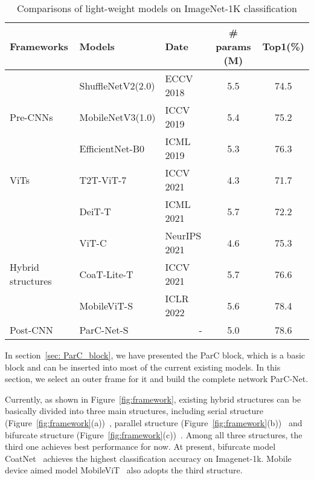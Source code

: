 \documentclass[10pt,twocolumn,letterpaper]{article}
\begin{document}
\begin{table*}[t]
\renewcommand\arraystretch{1.0}
\begin{center}
\begin{tabular}{l|l|l|c|c}
\hline
Frameworks  &   Models     &   Date  &   \# params (M)  &   Top1(\%)  \\
\hline
  &  ShuffleNetV2(2.0) &  ECCV 2018  &  5.5  & 74.5 \\
Pre-CNNs             &  MobileNetV3(1.0)  &  ICCV 2019  &  5.4  & 75.2 \\
                     &  EfficientNet-B0           &  ICML 2019  &  5.3  & 76.3 \\
\hline
ViTs                 &  T2T-ViT-7                 &  ICCV 2021  &  4.3  & 71.7 \\
                     &  DeiT-T                    &  ICML 2021  &  5.7  & 72.2 \\
\hline
                     &  ViT-C                      &  NeurIPS 2021 & 4.6 & 75.3 \\
Hybrid structures    &  CoaT-Lite-T               &  ICCV 2021  &  5.7  & 76.6 \\
                     &  MobileViT-S               &  ICLR 2022  &  5.6  & 78.4 \\
\hline
Post-CNN             &  ParC-Net-S              &  ~~~~~~~-          &  5.0  & 78.6 \\
\hline
\end{tabular}

\label{tab:lw_models}
\end{center}
\caption{Comparisons of light-weight models on ImageNet-1K classification}
\vspace{-0.3cm}
\end{table*}


In section~\ref{sec: ParC_block}, we have presented the ParC block, which is a basic block and can be inserted into most of the current existing models. In this section, we select an outer frame for it and build the complete network ParC-Net. 

Currently, as shown in Figure~\ref{fig:framework}, existing hybrid structures can be basically divided into three main structures, including serial structure (Figure~\ref{fig:framework}(a))~\cite{graham2021levit}\cite{xiao2021early}, parallel structure (Figure~\ref{fig:framework}(b))~\cite{chen2021mobile} and bifurcate structure (Figure~\ref{fig:framework}(c))~\cite{mehta2022mobilevit}\cite{dai2021coatnet}. Among all three structures, the third one achieves best performance for now. At present, bifurcate model CoatNet~\cite{dai2021coatnet} achieves the highest classification accuracy on Imagenet-1k. Mobile device aimed model MobileViT~\cite{mehta2022mobilevit} also adopts the third structure. 
\end{document}
